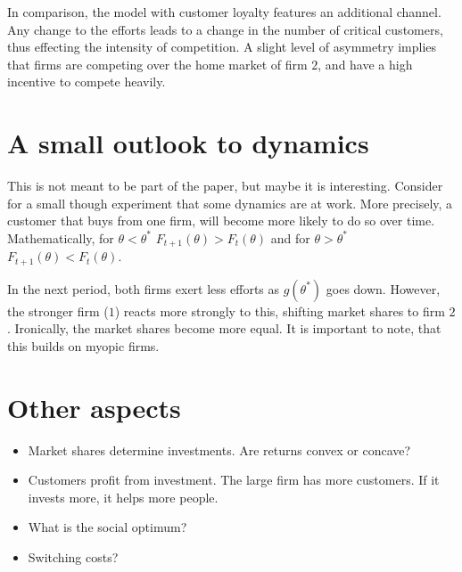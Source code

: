 \documentclass[a4paper, 11pt]{article}
\begin{document}
In comparison, the model with customer loyalty features an additional channel. Any change to the efforts leads to a change in the number of critical customers, thus effecting the intensity of competition. A slight level of asymmetry implies that firms are competing over the home market of firm $2$, and have a high incentive to compete heavily. 

\section{A small outlook to dynamics}
This is not meant to be part of the paper, but maybe it is interesting. Consider for a small though experiment that some dynamics are at work. More precisely, a customer that buys from one firm, will become more likely to do so over time. Mathematically, for $\theta<\theta^*$ $F_{t+1}(\theta)>F_t(\theta)$ and for $\theta>\theta^*$ $F_{t+1}(\theta)<F_t(\theta)$.

In the next period, both firms exert less efforts as $g(\theta^*)$ goes down. However, the stronger firm ($1$) reacts more strongly to this, shifting market shares to firm $2$. Ironically, the market shares become more equal. It is important to note, that this builds on myopic firms.  
\section{Other aspects}
\begin{itemize}
	\item Market shares determine investments. Are returns convex or concave?
	\item Customers profit from investment. The large firm has more customers. If it invests more, it helps more people. 
	\item What is the social optimum?
	\item Switching costs?
\end{itemize}

 
\end{document}
